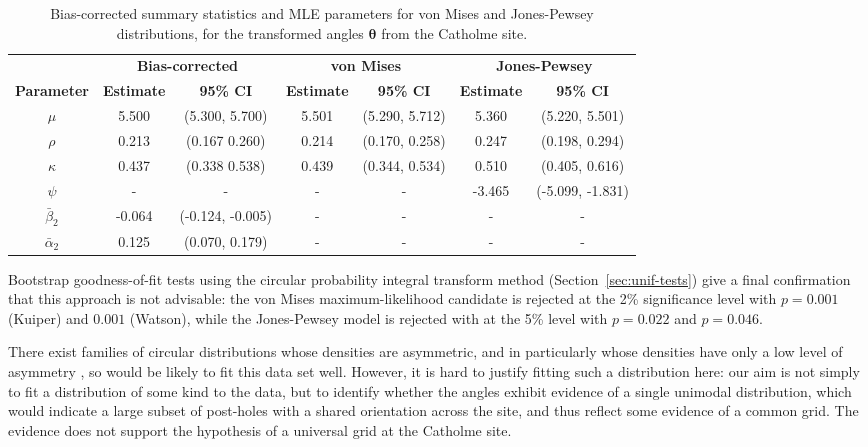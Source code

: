 \documentclass[../../ArchStats.tex]{subfiles}
\begin{document}
\begin{table}[!ht]
\footnotesize
\centering
\caption{Bias-corrected summary statistics and MLE parameters for von Mises and Jones-Pewsey distributions, for the transformed angles $\boldsymbol{\theta}$ from the Catholme site.}
\label{tab:Catholme-statistics}
\begin{tabular}{c|cc|cc|cc}
\hline 
 & \multicolumn{2}{c|}{\textbf{Bias-corrected}} & \multicolumn{2}{c|}{\textbf{von Mises}} & \multicolumn{2}{c}{\textbf{Jones-Pewsey}} \\
\textbf{Parameter} & \textbf{Estimate} & \textbf{95\% CI} & \textbf{Estimate} & \textbf{95\% CI} & \textbf{Estimate} & \textbf{95\% CI} \\
\hline
$\mu$ & 5.500 & (5.300,  5.700) &   5.501 &    (5.290,    5.712) &   5.360  &  (5.220,    5.501) \\ 
$\rho$ & 0.213 & (0.167  0.260) & 0.214 &   (0.170,    0.258) & 0.247 &   (0.198,    0.294) \\ 
$\kappa$ & 0.437 & (0.338  0.538) & 0.439 &   (0.344,    0.534) & 0.510  &  (0.405,    0.616) \\ 
$\psi$ & - & - & - & - & -3.465 &  (-5.099,   -1.831) \\ 
$\bar{\beta}_2$ & -0.064 &(-0.124, -0.005) & - & - & - & - \\ 
$\bar{\alpha}_2 $ & 0.125 & (0.070,  0.179) & - & - & - & - \\ 
\hline
\end{tabular}
\end{table}

Bootstrap goodness-of-fit tests using the circular probability integral transform method (Section~\ref{sec:unif-tests}) give a final confirmation that this approach is not advisable: the von Mises maximum-likelihood candidate is rejected at the 2\% significance level with $p = 0.001$ (Kuiper) and $0.001$ (Watson), while the Jones-Pewsey model is rejected with at the 5\% level with $p = 0.022$ and $p =  0.046$.

There exist families of circular distributions whose densities are asymmetric, and in particularly whose densities have only a low level of asymmetry \cite[4.3.11]{Pewsey2014}, so would be likely to fit this data set well. However, it is hard to justify fitting such a distribution here: our aim is not simply to fit a distribution of some kind to the data, but to identify whether the angles exhibit evidence of a single unimodal distribution, which would indicate a large subset of post-holes with a shared orientation across the site, and thus reflect some evidence of a common grid. The evidence does not support the hypothesis of a universal grid at the Catholme site. 
\end{document}
